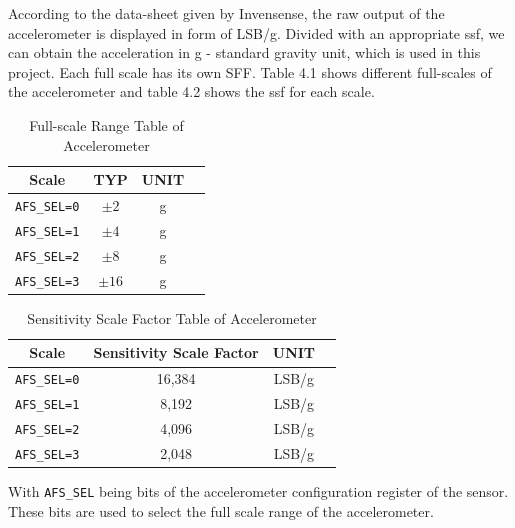 \documentclass[letterpaper,12pt,titlepage,oneside,final]{book}
\let\origdoublepage\cleardoublepage
\newcommand{\clearemptydoublepage}{%
	\clearpage{\pagestyle{empty}\origdoublepage}}
\let\cleardoublepage\clearemptydoublepage
\begin{document}
According to the data-sheet given by Invensense\textregistered, the raw output of the accelerometer is displayed in form of LSB/g. Divided with an appropriate \gls{ssf}, we can obtain the acceleration in g - standard gravity unit, which is used in this project. Each full scale has its own SFF. Table 4.1 shows different full-scales of the accelerometer and table 4.2 shows the \gls{ssf} for each scale.
\cleardoublepage
\begin{table}[h!]
	\begin{center}
		\begin{tabular}{ |c|c|c|c| } 
			\hline
			Scale & TYP & UNIT \\
			\hline
			\verb|AFS_SEL=0| & $\pm2$ & g \\ 
			\verb|AFS_SEL=1|& $\pm4$ & g \\ 
			\verb|AFS_SEL=2|& $\pm8$ & g \\
			\verb|AFS_SEL=3|& $\pm16$ & g\\
			\hline
		\end{tabular}
		\caption{Full-scale Range Table of Accelerometer}
		\label{table:1}
	\end{center}
\end{table}
\begin{table}[h!]
	\begin{center}
		\begin{tabular}{ |c|c|c|c| } 
			\hline
			Scale & Sensitivity Scale Factor & UNIT \\
			\hline
			\verb|AFS_SEL=0| & 16,384 & LSB/g \\ 
			\verb|AFS_SEL=1|& 8,192 & LSB/g \\ 
			\verb|AFS_SEL=2|& 4,096 & LSB/g \\
			\verb|AFS_SEL=3|& 2,048 & LSB/g\\
			\hline
		\end{tabular}
		\caption{Sensitivity Scale Factor Table of Accelerometer}
		\label{table:1}
	\end{center}
\end{table}
With \verb|AFS_SEL| being bits of the accelerometer configuration register of the sensor. These bits are used to select the full scale range of the accelerometer. \par 
\end{document}
